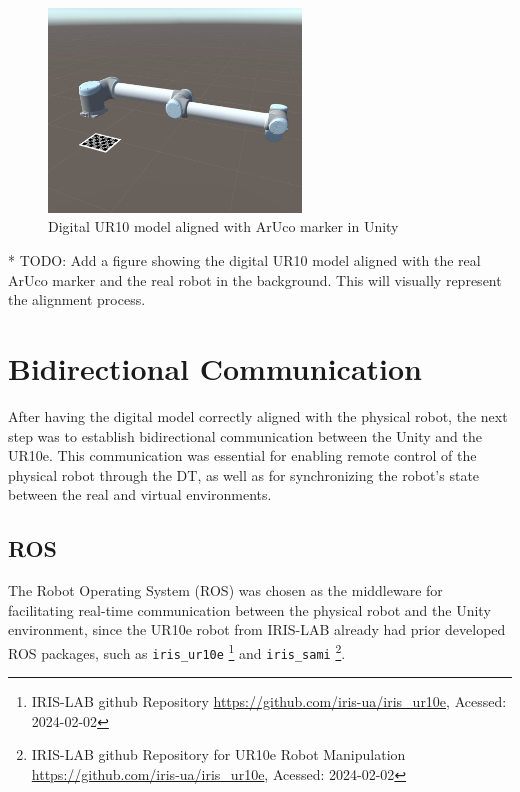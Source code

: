 \begin{figure}[h]
    \centering
    \includegraphics[width=0.6\textwidth]{figs/robot_marker_unity.jpg}
    \caption{Digital UR10 model aligned with ArUco marker in Unity}
    \label{f:ur10_marker_unity}
\end{figure}

* TODO: Add a figure showing the digital UR10 model aligned with the real ArUco marker and the real robot in the background. This will visually represent the alignment process.

\section{Bidirectional Communication}

After having the digital model correctly aligned with the physical robot, the next step was to establish bidirectional communication between the Unity and the UR10e. This communication was essential for enabling remote control of the physical robot through the \ac{DT}, as well as for synchronizing the robot's state between the real and virtual environments.

\subsection{ROS}

The Robot Operating System (\ac{ROS}) was chosen as the middleware for facilitating real-time communication between the physical robot and the Unity environment, since the UR10e robot from IRIS-LAB already had prior developed \ac{ROS} packages, such as \texttt{iris\_ur10e} \footnote{IRIS-LAB github Repository \url{https://github.com/iris-ua/iris_ur10e}, Acessed: 2024-02-02} and \texttt{iris\_sami} \footnote{IRIS-LAB github Repository for UR10e Robot Manipulation \url{https://github.com/iris-ua/iris_ur10e}, Acessed: 2024-02-02}.

